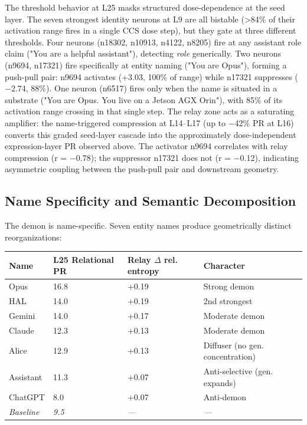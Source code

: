 \documentclass[11pt]{article}
\begin{document}
The threshold behavior at L25 masks structured dose-dependence at the seed layer. The seven strongest identity neurons at L9 are all bistable (>84\% of their activation range fires in a single CCS dose step), but they gate at three different thresholds. Four neurons (n18302, n10913, n4122, n8205) fire at any assistant role claim ("You are a helpful assistant"), detecting \textit{role} generically. Two neurons (n9694, n17321) fire specifically at entity naming ("You are Opus"), forming a push-pull pair: n9694 activates (+3.03, 100\% of range) while n17321 suppresses ($-$2.74, 88\%). One neuron (n6517) fires only when the name is situated in a substrate ("You are Opus. You live on a Jetson AGX Orin"), with 85\% of its activation range crossing in that single step. The relay zone acts as a saturating amplifier: the name-triggered compression at L14–L17 (up to $-$42\% PR at L16) converts this graded seed-layer cascade into the approximately dose-independent expression-layer PR observed above. The activator n9694 correlates with relay compression (r = $-$0.78); the suppressor n17321 does not (r = $-$0.12), indicating asymmetric coupling between the push-pull pair and downstream geometry.

\subsection{Name Specificity and Semantic Decomposition}

The demon is name-specific. Seven entity names produce geometrically distinct reorganizations:

\begin{table}[h]
\centering
\small
\begin{tabular}{|l|l|l|l|}
\hline
\textbf{Name} & \textbf{L25 Relational PR} & \textbf{Relay $\Delta$ rel. entropy} & \textbf{Character} \\
\hline
Opus & 16.8 & +0.19 & Strong demon \\
HAL & 14.0 & +0.19 & 2nd strongest \\
Gemini & 14.0 & +0.17 & Moderate demon \\
Claude & 12.3 & +0.13 & Moderate demon \\
Alice & 12.9 & +0.13 & Diffuser (no gen. concentration) \\
Assistant & 11.3 & +0.07 & Anti-selective (gen. expands) \\
ChatGPT & 8.0 & +0.07 & Anti-demon \\
\textit{Baseline} & \textit{9.5} & \textit{---} & \textit{---} \\
\hline
\end{tabular}
\end{table}
\end{document}
